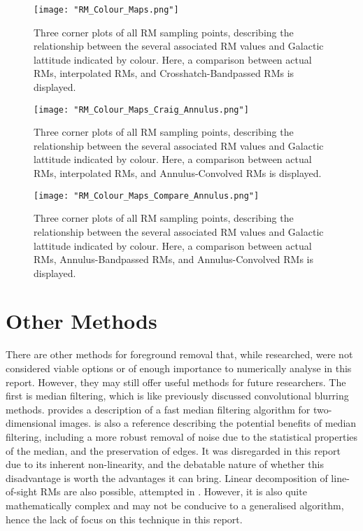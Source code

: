 \begin{figure}
    \texttt{[image: "RM\_Colour\_Maps.png"]}
    \centering
    \caption{Three corner plots of all RM sampling points, describing the relationship between the several associated RM values and Galactic lattitude indicated by colour. Here, a comparison between actual RMs, interpolated RMs, and Crosshatch-Bandpassed RMs is displayed.}
    \label{fig:colour_maps_1}
\end{figure}

\begin{figure}
    \texttt{[image: "RM\_Colour\_Maps\_Craig\_Annulus.png"]}
    \centering
    \caption{Three corner plots of all RM sampling points, describing the relationship between the several associated RM values and Galactic lattitude indicated by colour. Here, a comparison between actual RMs, interpolated RMs, and Annulus-Convolved RMs is displayed.}
    \label{fig:colour_maps_2}
\end{figure}

\begin{figure}
    \texttt{[image: "RM\_Colour\_Maps\_Compare\_Annulus.png"]}
    \centering
    \caption{Three corner plots of all RM sampling points, describing the relationship between the several associated RM values and Galactic lattitude indicated by colour. Here, a comparison between actual RMs, Annulus-Bandpassed RMs, and Annulus-Convolved RMs is displayed.}
    \label{fig:colour_maps_3}
\end{figure}


\newpage

\section{Other Methods}
\label{sec:other_methods}

There are other methods for foreground removal that, while researched, were not considered viable options or of enough importance to numerically analyse in this report. However, they may still offer useful methods for future researchers. The first is median filtering, which is like previously discussed convolutional blurring methods. \cite{ID39} provides a description of a fast median filtering algorithm for two-dimensional images. \cite{ID40} is also a reference describing the potential benefits of median filtering, including a more robust removal of noise due to the statistical properties of the median, and the preservation of edges. It was disregarded in this report due to its inherent non-linearity, and the debatable nature of whether this disadvantage is worth the advantages it can bring. Linear decomposition of line-of-sight RMs are also possible, attempted in \cite{ID21}. However, it is also quite mathematically complex and may not be conducive to a generalised algorithm, hence the lack of focus on this technique in this report.


